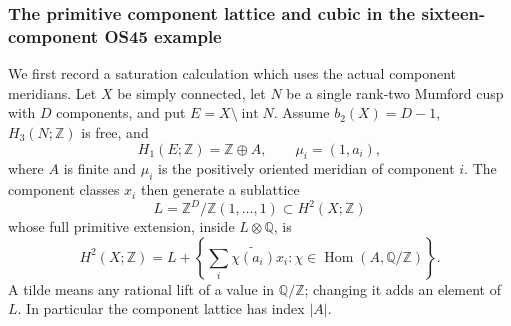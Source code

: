 

\subsubsection*{The primitive component lattice and cubic in the sixteen-component OS45 example}
We first record a saturation calculation which uses the actual component
meridians. Let $X$ be simply connected, let $N$ be a single rank-two
Mumford cusp with $D$ components, and put $E=X\setminus\operatorname{int}N$.
Assume $b_2(X)=D-1$, $H_3(N;\mathbb Z)$ is free, and
\[
 H_1(E;\mathbb Z)=\mathbb Z\oplus A,\qquad
                       \mu_i=(1,a_i),                      \tag{D.PC1}
\]
where $A$ is finite and $\mu_i$ is the positively oriented meridian of
component $i$. The component classes $x_i$ then generate a sublattice
\[
 L=\mathbb Z^D/\mathbb Z(1,\ldots,1)
                       \subset H^2(X;\mathbb Z)
\]
whose full primitive extension, inside $L\otimes\mathbb Q$, is
\[
 H^2(X;\mathbb Z)
   =L+\left\{\sum_i\widetilde{\chi(a_i)}x_i:
                         \chi\in\operatorname{Hom}(A,\mathbb Q/\mathbb Z)
        \right\}.                                        \tag{D.PC2}
\]
A tilde means any rational lift of a value in $\mathbb Q/\mathbb Z$;
changing it adds an element of $L$. In particular the component
lattice has index $|A|$.

